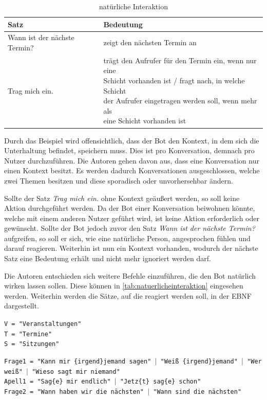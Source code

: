 \begin{table}[H]
\centering
\begin{tabular}{l|l}
\textbf{Satz} & \textbf{Bedeutung }\\
 \hline
Wann ist der nächste Termin? & zeigt den nächsten Termin an \\
Trag mich ein. & \makecell{trägt den Aufrufer für den Termin ein, wenn nur eine\\ Schicht vorhanden ist / fragt nach, in welche Schicht\\ der Aufrufer eingetragen werden soll, wenn mehr als\\ eine Schicht vorhanden ist} \\
\end{tabular}
\caption{natürliche Interaktion}
\label{tab:satzinteraktion}
\end{table}

Durch das Beispiel wird offensichtlich, dass der Bot den Kontext, in dem sich die Unterhaltung befindet, speichern muss. Dies ist pro Konversation, demnach pro Nutzer durchzuführen. Die Autoren gehen davon aus, dass eine Konversation nur einen Kontext besitzt. Es werden dadurch Konversationen ausgeschlossen, welche zwei Themen besitzen und diese sporadisch oder unvorhersehbar ändern.

Sollte der Satz \textit{Trag mich ein.} ohne Kontext geäußert werden, so soll keine Aktion durchgeführt werden. Da der Bot einer Konversation beiwohnen könnte, welche mit einem anderen Nutzer geführt wird, ist keine Aktion erforderlich oder gewünscht. Sollte der Bot jedoch zuvor den Satz \textit{Wann ist der nächste Termin?} aufgreifen, so soll er sich, wie eine natürliche Person, angesprochen fühlen und darauf reagieren. Weiterhin ist nun ein Kontext vorhanden, wodurch der nächste Satz eine Bedeutung erhält und nicht mehr ignoriert werden darf.


Die Autoren entschieden sich weitere Befehle einzuführen, die den Bot natürlich wirken lassen sollen. Diese können in \autoref{tab:natuerlicheinteraktion} eingesehen werden. Weiterhin werden die Sätze, auf die reagiert werden soll, in der EBNF dargestellt.

\texttt{V = "Veranstaltungen"}\\
\texttt{T = "Termine"}\\
\texttt{S = "{}Sitzungen"}

\texttt{Frage1 = "Kann mir \{irgend\}jemand sagen" $|$ "Weiß \{irgend\}jemand" $|$ "Wer weiß" $|$ "Wieso sagt mir niemand"}\\
\texttt{Apell1 = "{}Sag\{e\} mir endlich" $|$ "Jetz\{t\} sag\{e\} schon"}\\
\texttt{Frage2 = "Wann haben wir die nächsten" $|$ "Wann sind die nächsten"}

